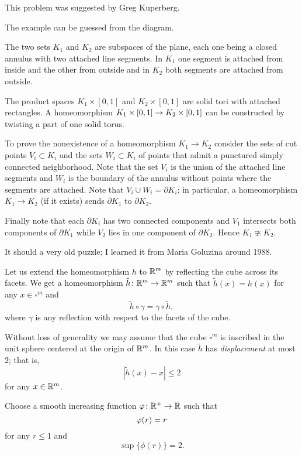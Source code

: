 This problem was suggested by Greg Kuperberg.


The example can be guessed from the diagram.

The two sets $K_1$ and $K_2$ are subspaces of the plane, 
each one being a closed annulus with two attached line segments.
In $K_1$ one segment is attached from inside and the other from outside and 
in $K_2$ both segments are attached from outside.

The product spaces $K_1\times[0,1]$ and $K_2\times[0,1]$ are solid tori with attached rectangles.
A homeomorphism $K_1\times[0,1]\z\to K_2\times[0,1]$ can be constructed by twisting a part of one solid torus.

To prove the nonexistence of a homeomorphism $K_1\to K_2$ consider the sets of cut points $V_i\subset K_i$ and the sets $W_i\subset K_i$ of points that admit a punctured simply connected neighborhood.
Note that the set $V_i$ is the union of the attached line segments 
and $W_i$ is the boundary of the annulus without points where the segments are attached.
Note that $V_i\cup W_i=\partial K_i$;
in particular, a homeomorphism $K_1\to K_2$ (if it exists) sends $\partial K_1$ to $\partial K_2$.

Finally note that each $\partial K_i$ has two connected components and 
$V_1$ intersects both components of $\partial K_1$
while $V_2$ lies in one component of $\partial K_2$.
Hence $K_1\ncong K_2$.
\qeds

It should a very old puzzle;
I learned it from Maria Goluzina around 1988.


Let us extend the homeomorphism $h$ to $\mathbb{R}^m$ by reflecting the cube across its facets.
We get a homeomorphism $\tilde h\colon\mathbb{R}^m\to\mathbb{R}^m$ such that $\tilde h(x)=h(x)$ for any $x\in\square^m$ and 
\[\tilde h\circ\gamma=\gamma\circ \tilde h,\]
where $\gamma$ is any reflection with respect to the facets of the cube.

Without loss of generality we may assume that the cube $\square^m$ is inscribed in the unit sphere centered at the origin of $\mathbb{R}^m$.
In this case $\tilde h$ has \emph{displacement} at most $2$;
that is, 
\[|\tilde h(x)-x|\le 2\]
for any $x\in\mathbb{R}^m$.

Choose a smooth increasing function $\varphi\colon\mathbb{R} ^{ +} \to\mathbb{R}$ such that
\[\phi(r)\z=r\] 
for any $r\le 1$ and 
\[\sup\{\phi(r)\}=2.\]

